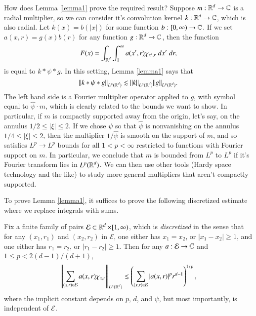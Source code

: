 How does Lemma \ref{lemma1} prove the required result? Suppose $m: \operatorname{\mathbb{R}}^d \to \operatorname{\mathbb{C}}$ is a radial multiplier, so we can consider it's convolution kernel $k: \operatorname{\mathbb{R}}^d \to \operatorname{\mathbb{C}}$, which is also radial. Let $k(x) = b(|x|)$ for some function $b: [0,\infty) \to \operatorname{\mathbb{C}}$. If we set $a(x,r) = g(x) b(r)$ for any function $g: \operatorname{\mathbb{R}}^d \to \operatorname{\mathbb{C}}$, then the function
%
\[ F(x) = \int_{\operatorname{\mathbb{R}}^d} \int_1^\infty a(x',r) \chi_{x', r}\; dx'\; dr, \]
%
is equal to $k * \psi * g$. In this setting, Lemma \ref{lemma1} says that
%
\[ \| k * \psi * g \|_{L^p(\operatorname{\mathbb{R}}^d)} \lesssim \| k \|_{L^p(\operatorname{\mathbb{R}}^d)} \| g \|_{L^p(\operatorname{\mathbb{R}}^d)}. \]
%
The left hand side is a Fourier multiplier operator applied to $g$, with symbol equal to $\widehat{\psi} \cdot m$, which is clearly related to the bounds we want to show. In particular, if $m$ is compactly supported away from the origin, let's say, on the annulus $1/2 \leq |\xi| \leq 2$. If we chose $\psi$ so that $\widehat{\psi}$ is nonvanishing on the annulus $1/4 \leq |\xi| \leq 2$, then the multiplier $1/\widehat{\psi}$ is smooth on the support of $m$, and so satisfies $L^p \to L^p$ bounds for all $1 < p < \infty$ restricted to functions with Fourier support on $m$. In particular, we conclude that $m$ is bounded from $L^p$ to $L^p$ if it's Fourier transform lies in $L^p(\operatorname{\mathbb{R}}^d)$. We can then use other tools (Hardy space technology and the like) to study more general multipliers that aren't compactly supported.

To prove Lemma \ref{lemma1}, it suffices to prove the following discretized estimate where we replace integrals with sums.

\begin{theorem} \label{lemma2}
    Fix a finite family of pairs $\mathcal{E} \subset \operatorname{\mathbb{R}}^d \times [1,\infty)$, which is \emph{discretized} in the sense that for any $(x_1,r_1)$ and $(x_2,r_2)$ in $\mathcal{E}$, one either has $x_1 = x_2$, or $|x_1 - x_2| \geq 1$, and one either has $r_1 = r_2$, or $|r_1 - r_2| \geq 1$. Then for any $a: \mathcal{E} \to \operatorname{\mathbb{C}}$ and $1 \leq p < 2(d - 1)/(d+1)$, 
    \[ \left\| \sum_{(x,r) \in \mathcal{E}} a(x,r) \chi_{x, r} \right\|_{L^p(\operatorname{\mathbb{R}}^d)} \lesssim \left( \sum_{(x,r) \in \mathcal{E}} |a(x,r)|^p r^{d-1} \right)^{1/p}, \]
    where the implicit constant depends on $p$, $d$, and $\psi$, but most importantly, is independent of $\mathcal{E}$.
\end{theorem}

